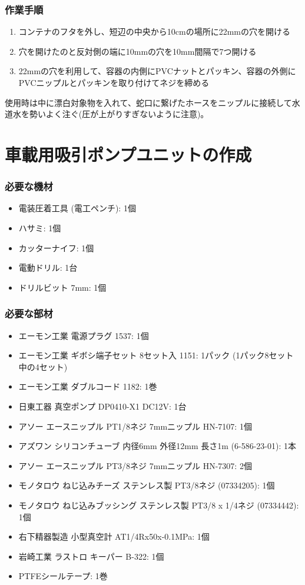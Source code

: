 \documentclass[titlepage,10pt,a4paper,uplatex]{jsbook}
\begin{document}
\subsubsection{作業手順}
\begin{enumerate}
\item コンテナのフタを外し、短辺の中央から10cmの場所に22mmの穴を開ける
\item 穴を開けたのと反対側の端に10mmの穴を10mm間隔で7つ開ける
\item 22mmの穴を利用して、容器の内側にPVCナットとパッキン、容器の外側にPVCニップルとパッキンを取り付けてネジを締める
\end{enumerate}

使用時は中に漂白対象物を入れて、蛇口に繋げたホースをニップルに接続して水道水を勢いよく注ぐ(圧が上がりすぎないように注意)。

\section{車載用吸引ポンプユニットの作成}\label{makingpumpunit}

\subsubsection{必要な機材}
\begin{itemize}
\item 電装圧着工具 (電工ペンチ): 1個
\item ハサミ: 1個
\item カッターナイフ: 1個
\item 電動ドリル: 1台
\item ドリルビット 7mm: 1個
\end{itemize}

\subsubsection{必要な部材}
\begin{itemize}
\item エーモン工業 電源プラグ 1537: 1個
\item エーモン工業 ギボシ端子セット 8セット入 1151: 1パック (1パック8セット中の4セット)
\item エーモン工業 ダブルコード 1182: 1巻
\item 日東工器 真空ポンプ DP0410-X1 DC12V: 1台
\item アソー エースニップル PT1/8ネジ 7mmニップル HN-7107: 1個
\item アズワン シリコンチューブ 内径6mm 外径12mm 長さ1m (6-586-23-01): 1本
\item アソー エースニップル PT3/8ネジ 7mmニップル HN-7307: 2個
\item モノタロウ ねじ込みチーズ ステンレス製 PT3/8ネジ (07334205): 1個
\item モノタロウ ねじ込みブッシング ステンレス製 PT3/8 x 1/4ネジ (07334442): 1個
\item 右下精器製造 小型真空計 AT1/4Rx50x-0.1MPa: 1個
\item 岩崎工業 ラストロ キーパー B-322: 1個
\item PTFEシールテープ: 1巻
\end{itemize}
\end{document}
